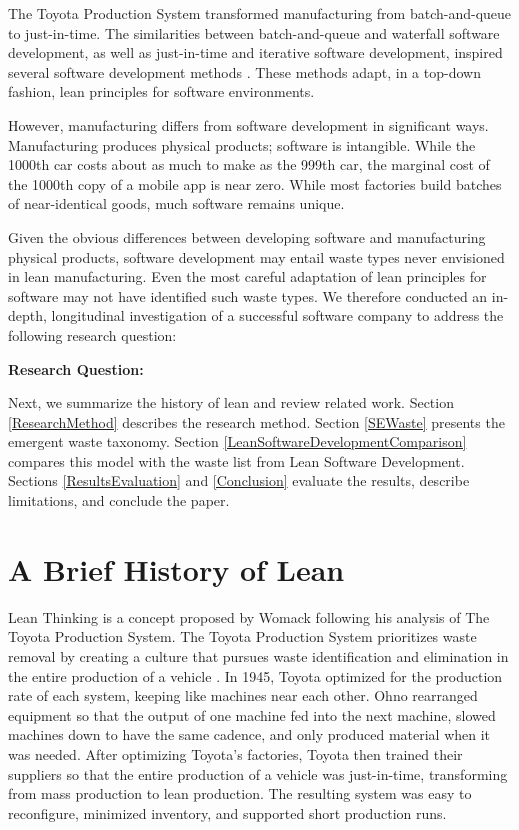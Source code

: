 The Toyota Production System \cite{OhnoToyotaProductionSystem, ShingoToyotaProductionSystem} transformed manufacturing from batch-and-queue to just-in-time. The similarities between batch-and-queue and waterfall software development, as well as just-in-time and iterative software development, inspired several software development methods \cite{PoppendieckLeanSoftwareDevelopment, AndersonKanban}. These methods adapt, in a top-down fashion, lean principles for software environments. 

However, manufacturing differs from software development in significant ways. Manufacturing produces physical products; software is intangible. While the 1000th car costs about as much to make as the 999th car, the marginal cost of the 1000th copy of a mobile app is near zero. While most factories build batches of near-identical goods, much software remains unique. 

Given the obvious differences between developing software and manufacturing physical products, software development may entail waste types never envisioned in lean manufacturing. Even the most careful adaptation of lean principles for software may not have identified such waste types. We therefore conducted an in-depth, longitudinal investigation of a successful software company to address the following research question: 

\textbf{Research Question: }

Next, we summarize the history of lean and review related work. Section \ref{ResearchMethod} describes the research method. Section \ref{SEWaste} presents the emergent waste taxonomy. Section \ref{LeanSoftwareDevelopmentComparison} compares this model with the waste list from Lean Software Development. Sections \ref{ResultsEvaluation} and \ref{Conclusion} evaluate the results, describe limitations, and conclude the paper.

\section{A Brief History of Lean}
\label{HistoryOfLean}
Lean Thinking is a concept proposed by Womack \cite{WomackLeanThinking} following his analysis of The Toyota Production System. The Toyota Production System prioritizes waste removal by creating a culture that pursues waste identification and elimination in the entire production of a vehicle \cite{OhnoToyotaProductionSystem, ShingoToyotaProductionSystem}. In 1945, Toyota optimized for the production rate of each system, keeping like machines near each other. Ohno rearranged equipment so that the output of one machine fed into the next machine, slowed machines down to have the same cadence, and only produced material when it was needed. After optimizing Toyota's factories, Toyota then trained their suppliers so that the entire production of a vehicle was just-in-time, transforming from mass production to lean production. The resulting  system was easy to reconfigure, minimized inventory, and supported short production runs.  

